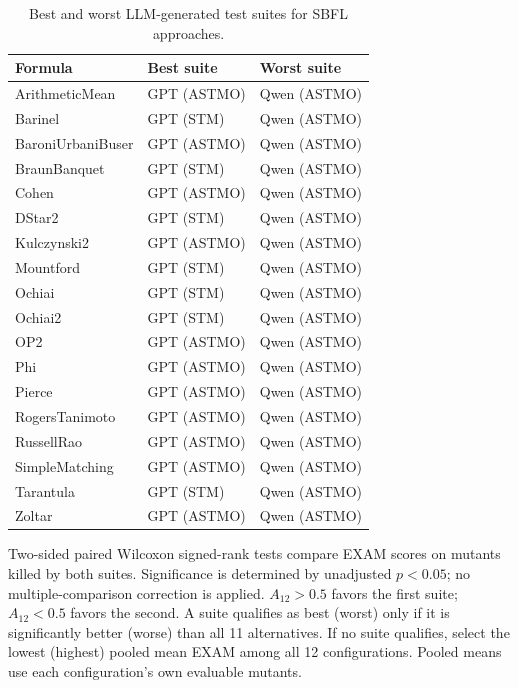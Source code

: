 \begin{table}[t]
\centering
\caption{Best and worst LLM-generated test suites for SBFL approaches.}
\label{tab:rq3bw-selection}
\begin{tabular}{lll}
\toprule
Formula & Best suite & Worst suite \\
\midrule
ArithmeticMean & GPT (ASTMO) & Qwen (ASTMO) \\
Barinel & GPT (STM) & Qwen (ASTMO) \\
BaroniUrbaniBuser & GPT (ASTMO) & Qwen (ASTMO) \\
BraunBanquet & GPT (STM) & Qwen (ASTMO) \\
Cohen & GPT (ASTMO) & Qwen (ASTMO) \\
DStar2 & GPT (STM) & Qwen (ASTMO) \\
Kulczynski2 & GPT (ASTMO) & Qwen (ASTMO) \\
Mountford & GPT (STM) & Qwen (ASTMO) \\
Ochiai & GPT (STM) & Qwen (ASTMO) \\
Ochiai2 & GPT (STM) & Qwen (ASTMO) \\
OP2 & GPT (ASTMO) & Qwen (ASTMO) \\
Phi & GPT (ASTMO) & Qwen (ASTMO) \\
Pierce & GPT (ASTMO) & Qwen (ASTMO) \\
RogersTanimoto & GPT (ASTMO) & Qwen (ASTMO) \\
RussellRao & GPT (ASTMO) & Qwen (ASTMO) \\
SimpleMatching & GPT (ASTMO) & Qwen (ASTMO) \\
Tarantula & GPT (STM) & Qwen (ASTMO) \\
Zoltar & GPT (ASTMO) & Qwen (ASTMO) \\
\bottomrule
\end{tabular}
\par\smallskip
\begin{minipage}{\linewidth}\footnotesize Two-sided paired Wilcoxon signed-rank tests compare EXAM scores on mutants killed by both suites. Significance is determined by unadjusted $p<0.05$; no multiple-comparison correction is applied. $A_{12}>0.5$ favors the first suite; $A_{12}<0.5$ favors the second. A suite qualifies as best (worst) only if it is significantly better (worse) than all 11 alternatives. If no suite qualifies, select the lowest (highest) pooled mean EXAM among all 12 configurations. Pooled means use each configuration's own evaluable mutants. 
\end{minipage}
\end{table}
